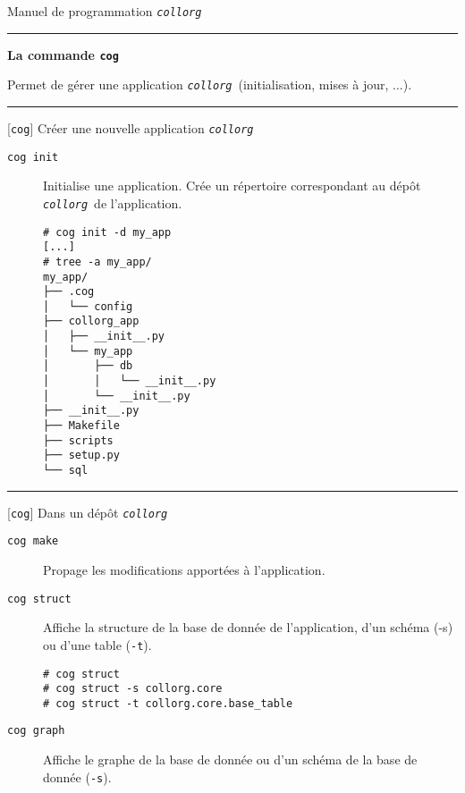 \documentclass[a4paper]{letter}
\newcommand{\section}[1]{
\rule{0.5cm}{0.1pt} \textbf{\large {#1}} \hrulefill
}
\newcommand{\subsection}[2]{
\rule{0.5cm}{0.1pt} {\scriptsize [{#1}]} {#2}
}
\newcommand{\collorg}{\texttt{\textit{collorg}}}
\newcommand{\cog}{\texttt{cog}}
\begin{document}
\begin{multicols}{3}


\begin{center}
{\Large Manuel de programmation \collorg}
\end{center}





\section{La commande \texttt{cog}}

Permet de gérer une application \collorg\ (initialisation, mises à jour, ...).

\subsection{\cog}{Créer une nouvelle application \collorg}

\begin{description}
\item[\texttt{cog init}] Initialise une application. Crée un répertoire correspondant au dépôt \collorg\ de l'application.
\begin{scriptsize}
\begin{verbatim}
# cog init -d my_app
[...]
# tree -a my_app/
my_app/
├── .cog
│   └── config
├── collorg_app
│   ├── __init__.py
│   └── my_app
│       ├── db
│       │   └── __init__.py
│       └── __init__.py
├── __init__.py
├── Makefile
├── scripts
├── setup.py
└── sql
\end{verbatim}
\end{scriptsize}
\end{description}
\subsection{\cog}{Dans un dépôt \collorg}
\begin{description}
\item[\texttt{cog make}] Propage les modifications apportées à l'application.
\item[\texttt{cog struct}] Affiche la structure de la base de donnée de l'application, d'un schéma (-s) ou d'une table (\texttt{-t}).

\begin{scriptsize}
\begin{verbatim}
# cog struct
# cog struct -s collorg.core
# cog struct -t collorg.core.base_table
\end{verbatim}
\end{scriptsize}
\item[\texttt{cog graph}] Affiche le graphe de la base de donnée ou d'un schéma de la base de donnée (\texttt{-s}).


\end{description}
\end{multicols}
\end{document}
